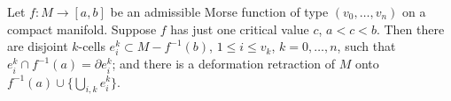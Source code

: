 Let $f: M \rightarrow [a,b]$ be an admissible Morse function of type $(v_0, \ldots, v_n)$ on a compact manifold. Suppose $f$ has just one critical value $c$, $a < c < b$. Then there are disjoint $k$-cells $e_i^k \subset M - f^{-1}(b)$, $1 \leq i \leq v_k$, $k = 0, \ldots, n$, such that $e_i^k \cap f^{-1}(a) = \partial e_i^k$; and there is a deformation retraction of $M$ onto $f^{-1}(a) \cup \{\bigcup_{i,k} e_i^k\}$.

